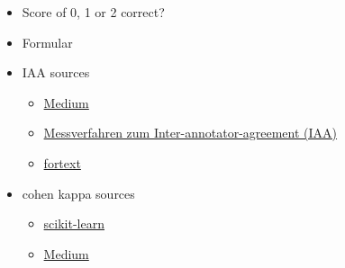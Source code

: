 \begin{itemize}
    \item Score of 0, 1 or 2 correct?
    \item Formular
    \item IAA sources
    \begin{itemize}
        \item \href{https://medium.com/@prasanNH/inter-annotator-agreement-in-natural-language-processing-f65685a22816}{Medium}
        \item \href{https://publications.goettingen-research-online.de/bitstream/2/111141/1/DWP44_Konle-IAA-Metriken.pdf}{Messverfahren zum Inter-annotator-agreement (IAA)}
        \item \href{https://fortext.net/ueber-fortext/glossar/inter-annotator-agreement-iaa}{fortext}
    \end{itemize}
    \item cohen kappa sources
    \begin{itemize}
        \item \href{https://scikit-learn.org/dev/modules/generated/sklearn.metrics.cohen_kappa_score.html}{scikit-learn}
        \item \href{https://surge-ai.medium.com/inter-annotator-agreement-an-introduction-to-cohens-kappa-statistic-dcc15ffa5ac4}{Medium}
    \end{itemize}
\end{itemize}